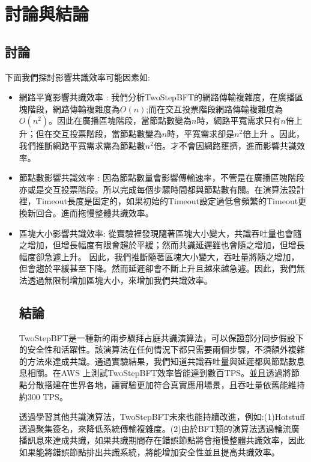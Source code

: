 \chapter{討論與結論}\label{se_8}
\section{討論}\label{se_8} 
下面我們探討影響共識效率可能因素如:

\begin{itemize}%

\item 網路平寬影響共識效率 :
我們分析TwoStepBFT的網路傳輸複雜度，在廣播區塊階段，網路傳輸複雜度為$O(n)$;而在交互投票階段網路傳輸複雜度為$O(n^2)$。因此在廣播區塊階段，當節點數變為$n$時，網路平寬需求只有$n$倍上升；但在交互投票階段，當節點數變為$n$時，平寬需求卻是$n^2$倍上升
。因此，我們推斷網路平寬需求需為節點數$n^2$倍。才不會因網路壅擠，進而影響共識效率。

\item 節點數影響共識效率 :
因為節點數量會影響傳輸速率，不管是在廣播區塊階段亦或是交互投票階段。所以完成每個步驟時間都與節點數有關。在演算法設計裡，Timeout長度是固定的，如果初始的Timeout設定過低會頻繁的Timeout更換新回合。進而拖慢整體共識效率。

\item 區塊大小影響共識效率:
從實驗裡發現隨著區塊大小變大，共識吞吐量也會隨之增加，但增長幅度有限會趨於平緩；然而共識延遲雖也會隨之增加，但增長幅度卻急遽上升。
因此，我們推斷隨著區塊大小變大，吞吐量將隨之增加，但會趨於平緩甚至下降。然而延遲卻會不斷上升且越來越急遽。因此，我們無法透過無限制增加區塊大小，來增加我們共識效率。



\section{結論}\label{se_8}
TwoStepBFT是一種新的兩步驟拜占庭共識演算法，可以保證部分同步假設下的安全性和活躍性。該演算法在任何情況下都只需要兩個步驟，不須額外複雜的方法來達成共識。通過實驗結果，我們知道共識吞吐量與延遲都與節點數息息相關。在AWS 上測試TwoStepBFT效率皆能達到數百TPS。並且透過將節點分散搭建在世界各地，讓實驗更加符合真實應用場景，且吞吐量依舊能維持約300 TPS。

透過學習其他共識演算法，TwoStepBFT未來也能持續改進，例如:(1)Hotstuff透過聚集簽名，來降低系統傳輸複雜度。(2)由於BFT類的演算法透過輪流廣播訊息來達成共識，如果共識期間存在錯誤節點將會拖慢整體共識效率，因此如果能將錯誤節點排出共識系統，將能增加安全性並且提高共識效率。

\end{itemize}